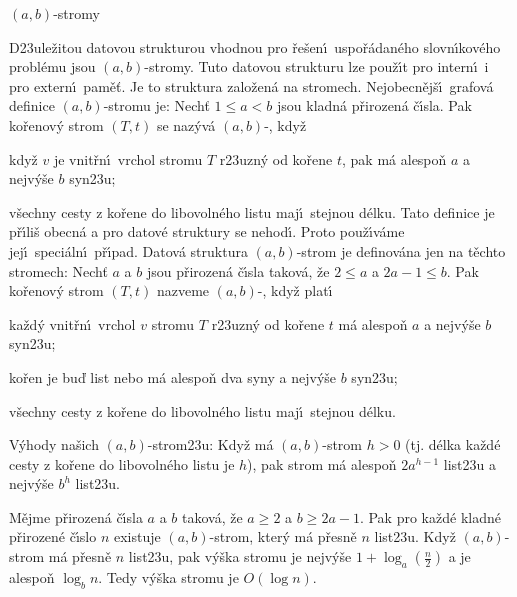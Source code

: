 \documentclass[a4paper,12pt]{article}
\def \emph#1{\underbar{#1}}
\begin{document}
\heading
$(a,b)$-stromy
\endheading

\flushpar D\accent23ule\v zitou datovou strukturou vhodnou pro 
\v re\v sen\'\i\ uspo\v r\'a\-dan\'e\-ho slovn\'\i\-ko\-v\'e\-ho probl\'emu jsou 
$(a,b)$-stromy. Tuto datovou strukturu lze pou\v z\'\i t pro intern\'\i\ i 
pro extern\'\i\ pam\v e\v t. Je to struktura zalo\v zen\'a na stromech. 
Nejobecn\v ej\v s\'\i\ grafov\'a defini\-ce $(a,b)$-stromu je:\newline 
Nech\v t $1\le a<b$ jsou kladn\'a p\v rirozen\'a \v c\'\i sla. Pak ko\v renov\'y 
strom $(T,t)$ se naz\'yv\'a $(a,b)$-\emph{strom}, kdy\v z 
\roster
\item
kdy\v z $v$ je vnit\v rn\'\i\ vrchol stromu $T$ r\accent23uzn\'y od 
ko\v rene $t$, pak m\'a alespo\v n $a$ a nejv\'y\v se $b$ syn\accent23u;
\item
v\v sechny cesty z ko\v rene do libovoln\'eho listu maj\'\i\ 
stejnou d\'elku.
\endroster
Tato definice je p\v r\'\i li\v s obecn\'a a pro datov\'e struktury se 
nehod\'\i . Proto pou\v z\'\i v\'ame jej\'\i\ speci\'aln\'\i\ p\v r\'\i pad. Datov\'a 
struktura $(a,b)$-strom je definov\'ana jen na t\v echto stromech: 
Nech\v t $a$ a $b$ jsou p\v rirozen\'a \v c\'\i sla takov\'a, \v ze $
2\le a$ a 
$2a-1\le b$. Pak ko\v renov\'y 
strom $(T,t)$ nazveme $(a,b)$-\emph{strom}, kdy\v z plat\'\i\ 
\roster
\item
ka\v zd\'y vnit\v rn\'\i\ vrchol $v$ stromu $T$ r\accent23uzn\'y od 
ko\v rene $t$ m\'a alespo\v n $a$ a nejv\'y\v se $b$ syn\accent23u;
\item
ko\v ren je bu\v d list nebo m\'a alespo\v n dva syny a nejv\'y\v se $
b$ 
syn\accent23u;
\item
v\v sechny cesty z ko\v rene do libovoln\'eho listu maj\'\i\ 
stejnou d\'elku.
\endroster
\medskip

\flushpar V\'yhody na\v sich $(a,b)$-strom\accent23u:\newline 
Kdy\v z m\'a $(a,b)$-strom \emph{v\'y\v sku} $h>0$ (tj. d\'elka ka\v zd\'e 
cesty z ko\v rene do libovoln\'eho listu je $h$), pak 
strom m\'a alespo\v n $2a^{h-1}$ list\accent23u a nejv\'y\v se $b^
h$ 
list\accent23u.


M\v ejme p\v rirozen\'a \v c\'\i sla $a$ a $
b$ takov\'a, 
\v ze $a\ge 2$ a $b\ge 2a-1$. Pak pro ka\v zd\'e kladn\'e p\v rirozen\'e 
\v c\'\i slo $n$ existuje $(a,b)$-strom, kter\'y m\'a p\v resn\v e $
n$ 
list\accent23u. Kdy\v z $(a,b)$-strom m\'a p\v resn\v e $n$ 
list\accent23u, pak v\'y\v ska stromu je nejv\'y\v se $1+\log_a(\frac 
n2)$ a 
je alespo\v n $\log_bn$. Tedy v\'y\v ska stromu je $O(\log n)$.
\endproclaim
\end{document}
